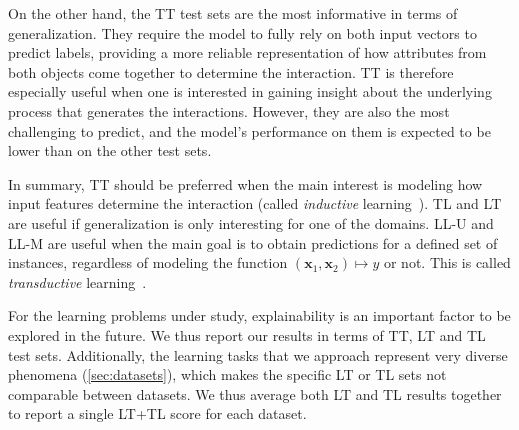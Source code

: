 On the other hand, the TT test sets are the most informative in terms of generalization. They require the model to fully rely on both input vectors to predict labels, providing a more reliable representation of how attributes from both objects come together to determine the interaction.
TT is therefore especially useful when one is interested in gaining insight about the underlying process that generates the interactions. However, they are also the most challenging to predict, and the model's performance on them is expected to be lower than on the other test sets.

In summary, TT should be preferred when the main interest is modeling how input features determine the interaction (called \emph{inductive} learning~\cite{chapelle2006semisupervised}). TL and LT are useful if generalization is only interesting for one of the domains. LL-U and LL-M are useful when the main goal is to obtain predictions for a defined set of instances, regardless of modeling the function $(\mathbf{x}_1, \mathbf{x}_2) \mapsto y$ or not. This is called \emph{transductive} learning~\cite{chapelle2006semisupervised}.



For the learning problems under study, explainability is an important factor to be explored in the future. We thus report our results in terms of TT, LT and TL test sets. Additionally, the learning tasks that we approach represent very diverse phenomena (\autoref{sec:datasets}), which makes the specific LT or TL sets not comparable between datasets. We thus average both LT and TL results together to report a single LT+TL score for each dataset.




